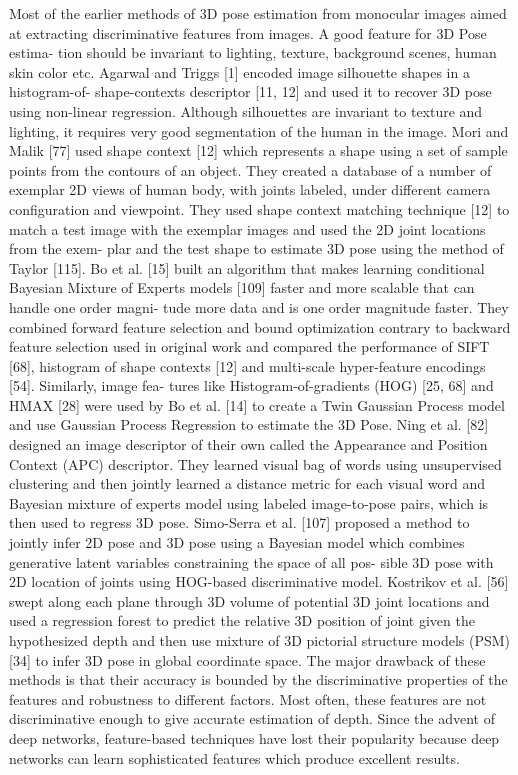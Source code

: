 Most of the earlier methods of 3D pose estimation from monocular images aimed at
extracting discriminative features from images. A good feature for 3D Pose estima-
tion should be invariant to lighting, texture, background scenes, human skin color
etc. Agarwal and Triggs [1] encoded image silhouette shapes in a histogram-of-
shape-contexts descriptor [11, 12] and used it to recover 3D pose using non-linear
regression. Although silhouettes are invariant to texture and lighting, it requires
very good segmentation of the human in the image. Mori and Malik [77] used
shape context [12] which represents a shape using a set of sample points from
the contours of an object. They created a database of a number of exemplar 2D
views of human body, with joints labeled, under different camera configuration
and viewpoint. They used shape context matching technique [12] to match a test
image with the exemplar images and used the 2D joint locations from the exem-
plar and the test shape to estimate 3D pose using the method of Taylor [115]. Bo
et al. [15] built an algorithm that makes learning conditional Bayesian Mixture of
Experts models [109] faster and more scalable that can handle one order magni-
tude more data and is one order magnitude faster. They combined forward feature
selection and bound optimization contrary to backward feature selection used in
original work and compared the performance of SIFT [68], histogram of shape
contexts [12] and multi-scale hyper-feature encodings [54]. Similarly, image fea-
tures like Histogram-of-gradients (HOG) [25, 68] and HMAX [28] were used by
Bo et al. [14] to create a Twin Gaussian Process model and use Gaussian Process
Regression to estimate the 3D Pose. Ning et al. [82] designed an image descriptor
of their own called the Appearance and Position Context (APC) descriptor. They
learned visual bag of words using unsupervised clustering and then jointly learned
a distance metric for each visual word and Bayesian mixture of experts model using
labeled image-to-pose pairs, which is then used to regress 3D pose. Simo-Serra et
al. [107] proposed a method to jointly infer 2D pose and 3D pose using a Bayesian
model which combines generative latent variables constraining the space of all pos-
sible 3D pose with 2D location of joints using HOG-based discriminative model.
Kostrikov et al. [56] swept along each plane through 3D volume of potential 3D
joint locations and used a regression forest to predict the relative 3D position of
joint given the hypothesized depth and then use mixture of 3D pictorial structure
models (PSM) [34] to infer 3D pose in global coordinate space.
The major drawback of these methods is that their accuracy is bounded by the
discriminative properties of the features and robustness to different factors. Most
often, these features are not discriminative enough to give accurate estimation of
depth. Since the advent of deep networks, feature-based techniques have lost their
popularity because deep networks can learn sophisticated features which produce
excellent results.

